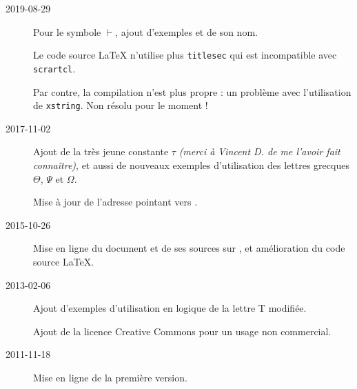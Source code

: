 
\begin{description}
    \item[2019-08-29] Pour le symbole $\vdash$, ajout d'exemples et de son nom.

    Le code source \LaTeX{} n'utilise plus \verb+titlesec+ qui est incompatible avec \verb+scrartcl+.

    Par contre, la compilation n'est plus propre : un problème avec l'utilisation de \verb+xstring+. Non résolu pour le moment !

    \item[2017-11-02] Ajout de la très jeune constante $\tau$ \emph{(merci à Vincent D. de me l'avoir fait connaître)}, et aussi de nouveaux exemples d'utilisation des lettres grecques $\Theta$, $\Psi$ et $\Omega$.

    Mise à jour de l'adresse pointant vers .

    \item[2015-10-26] Mise en ligne du document et de ses sources sur , et amélioration du code source \LaTeX.

    \item[2013-02-06] Ajout d'exemples d'utilisation en logique de la lettre T modifiée.

Ajout de la licence Creative Commons pour un usage non commercial.

    \item[2011-11-18] Mise en ligne de la première version.
\end{description}
